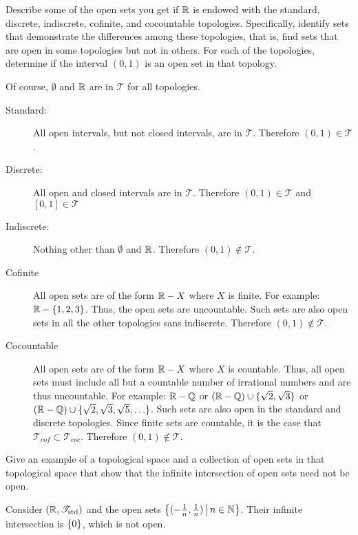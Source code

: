 \documentclass[letterpaper,12pt,fleqn]{article}
\newcommand{\T}{\mathscr{T}}
\newcommand{\Tstd}{\T_{\text{std}}}
\begin{document}
\begin{example}
  Describe some of the open sets you get if \(\mathbb{R}\) is endowed with the standard, discrete, indiscrete, cofinite,
  and cocountable topologies.  Specifically, identify sets that demonstrate the differences among these topologies,
  that is, find sets that are open in some topologies but not in others.  For each of the topologies, determine
  if the interval \((0,1)\) is an open set in that topology.

  Of course, \(\emptyset\) and \(\mathbb{R}\) are in \(\T\) for all topologies.

  \begin{description}
  \item[Standard:] All open intervals, but not closed intervals, are in \(\T\).  Therefore \((0,1)\in\T\).

  \item[Discrete:] All open and closed intervals are in \(\T\).  Therefore \((0,1)\in\T\) and \([0,1]\in\T\)

  \item[Indiscrete:] Nothing other than \(\emptyset\) and \(\mathbb{R}\).  Therefore \((0,1)\notin\T\).

  \item[Cofinite] All open sets are of the form \(\mathbb{R}-X\) where \(X\) is finite.  For example: \(\mathbb{R}-\{1,2,3\}\).
    Thus, the open sets are uncountable.  Such sets are also open sets in all the other topologies sans indiscrete.
    Therefore \((0,1)\notin\T\).

  \item[Cocountable] All open sets are of the form \(\mathbb{R}-X\) where \(X\) is countable.  Thus, all open sets must
    include all but a countable number of irrational numbers and are thus uncountable.  For example: \(\mathbb{R}-\mathbb{Q}\) or
    \((\mathbb{R}-\mathbb{Q})\cup\{\sqrt{2},\sqrt{3}\}\) or \((\mathbb{R}-\mathbb{Q})\cup\{\sqrt{2},\sqrt{3},\sqrt{5},\ldots\}\).  Such sets are
    also open in the standard and discrete topologies.  Since finite sets are countable, it is the case that
    \(\T_{cof}\subset\T_{coc}\).  Therefore \((0,1)\notin\T\).
  \end{description}
\end{example}

\begin{example}
  Give an example of a topological space and a collection of open sets in that topological space that show that the
  infinite intersection of open sets need not be open.

  Consider \((\R,\Tstd)\) and the open sets \(\left\{{(-\frac{1}{n},\frac{1}{n})}\,\middle|\,{n\in\mathbb{N}}\right\}\).  Their infinite
  intersection is \(\{0\}\), which is not open.
\end{example}
\end{document}
